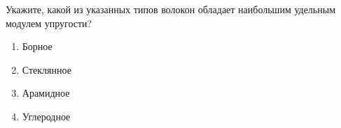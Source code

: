 
Укажите, какой из указанных типов волокон обладает наибольшим удельным модулем упругости?

\begin{enumerate}
    \item Борное
    \item Стеклянное
    \item Арамидное
    \item Углеродное
\end{enumerate}